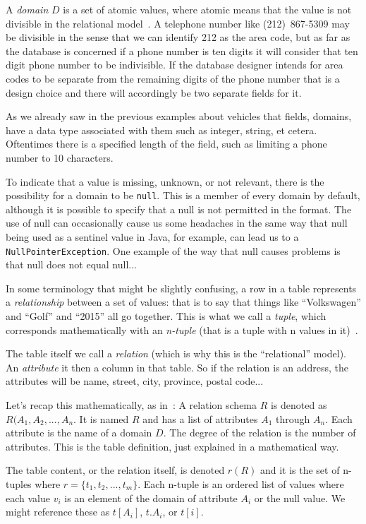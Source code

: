 A \textit{domain} $D$ is a set of atomic values, where atomic means that the value is not divisible in the relational model~\cite{fds}. A telephone number like {(212)~867-5309} may be divisible in the sense that we can identify 212 as the area code, but as far as the database is concerned if a phone number is ten digits it will consider that ten digit phone number to be indivisible. If the database designer intends for area codes to be separate from the remaining digits of the phone number that is a design choice and there will accordingly be two separate fields for it. 

As we already saw in the previous examples about vehicles that fields, domains, have a data type associated with them such as integer, string, et cetera. Oftentimes there is a specified length of the field, such as limiting a phone number to 10 characters. 

To indicate that a value is missing, unknown, or not relevant, there is the possibility for a domain to be \texttt{null}. This is a member of every domain by default, although it is possible to specify that a null is not permitted in the format. The use of null can occasionally cause us some headaches in the same way that null being used as a sentinel value in Java, for example, can lead us to a \texttt{NullPointerException}. One example of the way that null causes problems is that null does not equal null... 

In some terminology that might be slightly confusing, a row in a table represents a \textit{relationship} between a set of values: that is to say that things like ``Volkswagen'' and ``Golf'' and ``2015'' all go together. This is what we call a \textit{tuple}, which corresponds mathematically with an \textit{n-tuple} (that is a tuple with n values in it)~\cite{dsc}. 

The table itself we call a \textit{relation} (which is why this is the ``relational'' model). An \textit{attribute} it then a column in that table. So if the relation is an address, the attributes will be name, street, city, province, postal code... 

Let's recap this mathematically, as in~\cite{fds}: A relation schema $R$ is denoted as $R(A_{1}, A_{2}, ..., A_{n}$. It is named $R$ and has a list of attributes $A_{1}$ through $A_{n}$. Each attribute is the name of a domain $D$. The degree of the relation is the number of attributes. This is the table definition, just explained in a mathematical way.

The table content, or the relation itself, is denoted $r(R)$ and it is the set of n-tuples where $r = \{t_{1}, t_{2}, ..., t_{m}\}$. Each n-tuple is an ordered list of values where each value $v_{i}$ is an element of the domain of attribute $A_{i}$ or the null value. We might reference these as $t[A_{i}]$, $t.A_{i}$, or $t[i]$. 

